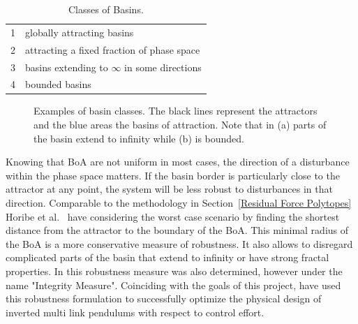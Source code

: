 \begin{table}[ht]
\caption[Spacing for units]{Classes of Basins. \cite{classify}}
\begin{tabular}{l l}
\hline
1       &  globally attracting basins\\
2       &  attracting a fixed fraction of phase space\\
3       & basins extending to $\infty$ in some directions\\
4       & bounded basins\\                
\hline
\end{tabular}
\label{t:class}
\end{table}
\begin{figure}
    \centering
    \qquad
    \caption{Examples of basin classes. The black lines represent the attractors and the blue areas the basins of attraction. Note that in (a) parts of the basin extend to infinity while (b) is bounded. \cite{classify}}%
    \label{fig:classes}%
\end{figure}

Knowing that BoA are not uniform in most cases, the direction of a disturbance within the phase space matters. If the basin border is particularly close to the attractor at any point, the system will be less robust to disturbances in that direction. Comparable to the methodology in Section~\ref{Residual Force Polytopes} Horibe et al.\ \cite{quant} have considering the worst case scenario by finding the shortest distance from the attractor to the boundary of the BoA.
This minimal radius of the BoA is a more conservative measure of robustness. It also allows to disregard complicated parts of the basin that extend to infinity or have strong fractal properties. In \cite{integr} this robustness measure was also determined, however under the name "Integrity Measure".
Coinciding with the goals of this project, \cite{quant} have used this robustness formulation to successfully optimize the physical design of inverted multi link pendulums with respect to control effort.
 

